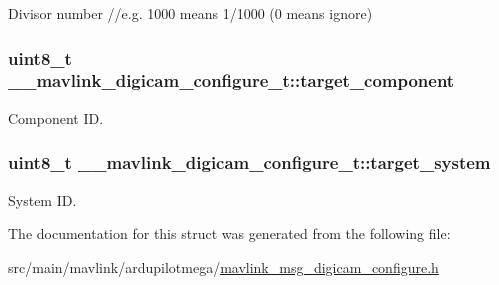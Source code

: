 Divisor number //e.g. 1000 means 1/1000 (0 means ignore) 

\hypertarget{struct____mavlink__digicam__configure__t_a46cbc82dab1af4e8b7e30c37bf07d5cd}{
\subsubsection[{target\+\_\+component}]{\setlength{\rightskip}{0pt plus 5cm}uint8\+\_\+t \+\_\+\+\_\+mavlink\+\_\+digicam\+\_\+configure\+\_\+t\+::target\+\_\+component}}\label{struct____mavlink__digicam__configure__t_a46cbc82dab1af4e8b7e30c37bf07d5cd}


Component I\+D. 

\hypertarget{struct____mavlink__digicam__configure__t_a66c0795ecbfe0f03899bec91b155d8d1}{
\subsubsection[{target\+\_\+system}]{\setlength{\rightskip}{0pt plus 5cm}uint8\+\_\+t \+\_\+\+\_\+mavlink\+\_\+digicam\+\_\+configure\+\_\+t\+::target\+\_\+system}}\label{struct____mavlink__digicam__configure__t_a66c0795ecbfe0f03899bec91b155d8d1}


System I\+D. 



The documentation for this struct was generated from the following file\+:\begin{DoxyCompactItemize}
\item 
src/main/mavlink/ardupilotmega/\hyperlink{mavlink__msg__digicam__configure_8h}{mavlink\+\_\+msg\+\_\+digicam\+\_\+configure.\+h}\end{DoxyCompactItemize}
